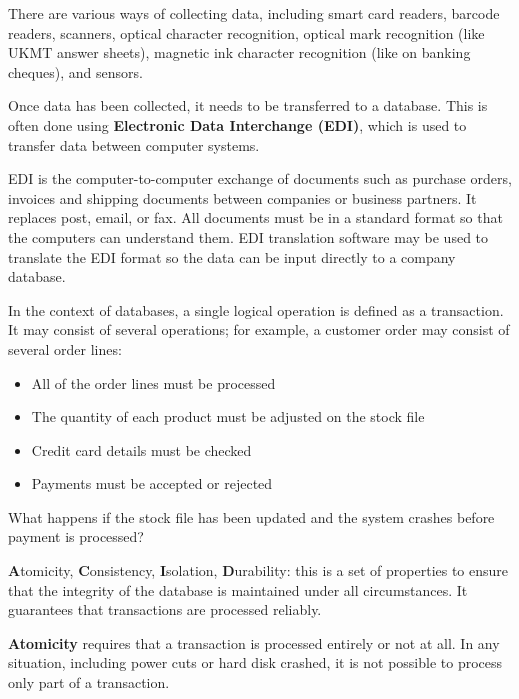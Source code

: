 \documentclass[../main.tex]{subfile}
\begin{document}


There are various ways of collecting data, including smart card readers, barcode readers, scanners, optical character recognition, optical mark recognition (like UKMT answer sheets), magnetic ink character recognition (like on banking cheques), and sensors.

Once data has been collected, it needs to be transferred to a database. This is often done using \textbf{Electronic Data Interchange (EDI)}, which is used to transfer data between computer systems.


EDI is the computer-to-computer exchange of documents such as purchase orders, invoices and shipping documents between companies or business partners. It replaces post, email, or fax. All documents must be in a standard format so that the computers can understand them. EDI translation software may be used to translate the EDI format so the data can be input directly to a company database.


In the context of databases, a single logical operation is defined as a transaction. It may consist of several operations; for example, a customer order may consist of several order lines:
\begin{itemize}
	\item All of the order lines must be processed
	\item The quantity of each product must be adjusted on the stock file
	\item Credit card details must be checked
	\item Payments must be accepted or rejected
\end{itemize}

What happens if the stock file has been updated and the system crashes before payment is processed?


\textbf{A}tomicity, \textbf{C}onsistency, \textbf{I}solation, \textbf{D}urability: this is a set of properties to ensure that the integrity of the database is maintained under all circumstances. It guarantees that transactions are processed reliably.

\textbf{Atomicity} requires that a transaction is processed entirely or not at all. In any situation, including power cuts or hard disk crashed, it is not possible to process only part of a transaction.
\end{document}
